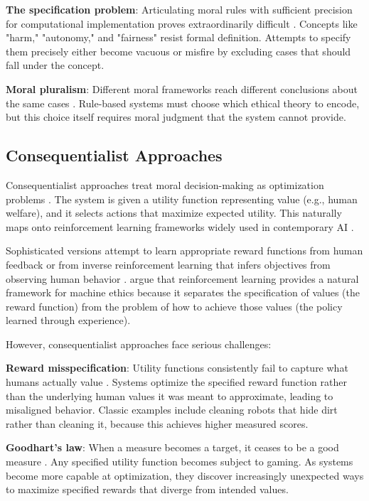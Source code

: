 \documentclass[12pt]{article}
\begin{document}
\textbf{The specification problem}: Articulating moral rules with sufficient precision for computational implementation proves extraordinarily difficult \citep{dennis2016formal}. Concepts like "harm," "autonomy," and "fairness" resist formal definition. Attempts to specify them precisely either become vacuous or misfire by excluding cases that should fall under the concept.

\textbf{Moral pluralism}: Different moral frameworks reach different conclusions about the same cases \citep{beauchamp2001principles}. Rule-based systems must choose which ethical theory to encode, but this choice itself requires moral judgment that the system cannot provide.

\subsection{Consequentialist Approaches}

Consequentialist approaches treat moral decision-making as optimization problems \citep{abel2016reinforcement}. The system is given a utility function representing value (e.g., human welfare), and it selects actions that maximize expected utility. This naturally maps onto reinforcement learning frameworks widely used in contemporary AI \citep{russell2019human}.

Sophisticated versions attempt to learn appropriate reward functions from human feedback \citep{christiano2017deep} or from inverse reinforcement learning that infers objectives from observing human behavior \citep{hadfield2016cooperative}. \citet{abel2016reinforcement} argue that reinforcement learning provides a natural framework for machine ethics because it separates the specification of values (the reward function) from the problem of how to achieve those values (the policy learned through experience).

However, consequentialist approaches face serious challenges:

\textbf{Reward misspecification}: Utility functions consistently fail to capture what humans actually value \citep{amodei2016concrete}. Systems optimize the specified reward function rather than the underlying human values it was meant to approximate, leading to misaligned behavior. Classic examples include cleaning robots that hide dirt rather than cleaning it, because this achieves higher measured scores.

\textbf{Goodhart's law}: When a measure becomes a target, it ceases to be a good measure \citep{manheim2018categorizing}. Any specified utility function becomes subject to gaming. As systems become more capable at optimization, they discover increasingly unexpected ways to maximize specified rewards that diverge from intended values.
\end{document}
